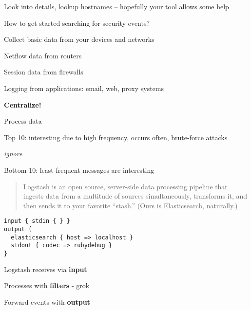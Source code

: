 \documentclass[Screen16to9,17pt]{foils}
\begin{document}
Look into details, lookup hostnames -- hopefully your tool allows some help





\begin{list1}
\item How to get started searching for security events?
\item Collect basic data from your devices and networks
\begin{list2}
\item Netflow data from routers
\item Session data from firewalls
\item Logging from applications: email, web, proxy systems
\end{list2}
\item {\bf Centralize!}
\item Process data
\begin{list2}
\item Top 10: interesting due to high frequency, occurs often, brute-force attacks
\item {\it ignore}
\item Bottom 10: least-frequent messages are interesting
\end{list2}
\end{list1}






\begin{quote}
  Logstash is an open source, server-side data processing pipeline that ingests data from a multitude of sources simultaneously, transforms it, and then sends it to your favorite “stash.” (Ours is Elasticsearch, naturally.)\\
\end{quote}

\begin{verbatim}
input { stdin { } }
output {
  elasticsearch { host => localhost }
  stdout { codec => rubydebug }
}
\end{verbatim}



\begin{list2}
\item Logstash receives via {\bf input}
\item Processes with {\bf filters} - grok
\item Forward events with {\bf output}
\end{list2}
\end{document}
